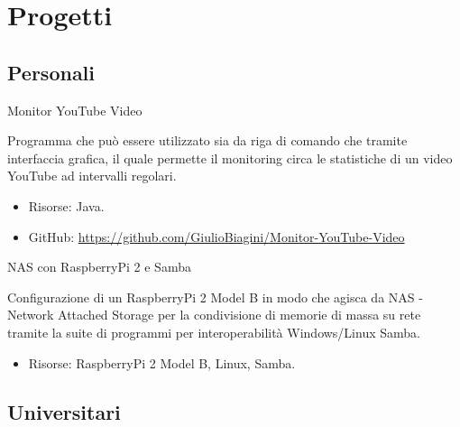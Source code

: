 %
%
%
%
%
%



\section{Progetti}

\subsection{Personali}

{Monitor YouTube Video}
{}
{}
{}
{Programma che può essere utilizzato sia da riga di comando che tramite
interfaccia grafica, il quale permette il monitoring circa le statistiche di un
video YouTube ad intervalli regolari.
\begin{itemize}
	\item Risorse: Java.
	\item GitHub: \url{https://github.com/GiulioBiagini/Monitor-YouTube-Video}
\end{itemize}}

{NAS con RaspberryPi 2 e Samba}
{}
{}
{}
{Configurazione di un RaspberryPi 2 Model B in modo che agisca da NAS - Network
Attached Storage per la condivisione di memorie di massa su rete tramite la
suite di programmi per interoperabilità Windows/Linux Samba.
\begin{itemize}
	\item Risorse: RaspberryPi 2 Model B, Linux, Samba.
\end{itemize}}



\subsection{Universitari}

